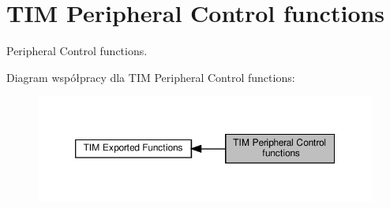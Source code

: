 \hypertarget{group___t_i_m___exported___functions___group8}{}\section{T\+IM Peripheral Control functions}
\label{group___t_i_m___exported___functions___group8}


Peripheral Control functions.  


Diagram współpracy dla T\+IM Peripheral Control functions\+:\nopagebreak
\begin{figure}[H]
\begin{center}
\leavevmode
\includegraphics[width=350pt]{group___t_i_m___exported___functions___group8}
\end{center}
\end{figure}
